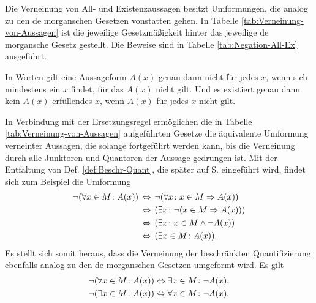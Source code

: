 Die Verneinung von All- und Existenzaussagen besitzt Umformungen, die
analog zu den de morganschen Gesetzen vonstatten gehen. In Tabelle
\ref{tab:Verneinung-von-Aussagen} ist die jeweilige Gesetzmäßigkeit
hinter das jeweilige de morgansche Gesetz gestellt. Die Beweise sind in
Tabelle \ref{tab:Negation-All-Ex} ausgeführt.

In Worten gilt eine Aussageform $A(x)$ genau dann nicht für jedes $x$,
wenn sich mindestens ein $x$ findet, für das $A(x)$ nicht gilt.
Und es existiert genau dann kein $A(x)$ erfüllendes $x$, wenn
$A(x)$ für jedes $x$ nicht gilt.

In Verbindung mit der Ersetzungsregel ermöglichen die in Tabelle
\ref{tab:Verneinung-von-Aussagen} aufgeführten Gesetze die
äquivalente Umformung verneinter Aussagen, die solange fortgeführt
werden kann, bis die Verneinung durch alle Junktoren und Quantoren
der Aussage gedrungen ist. Mit der Entfaltung von Def.
\ref{def:Beschr-Quant}, die später auf S. \pageref{def:Beschr-Quant}
eingeführt wird, findet sich zum Beispiel die Umformung
\begin{align*}
\lnot(\forall x\in M\colon A(x))
&\,\Leftrightarrow\, \lnot(\forall x\colon x\in M\Rightarrow A(x))\\
&\,\Leftrightarrow\, (\exists x\colon\lnot (x\in M\Rightarrow A(x)))\\
&\,\Leftrightarrow\, (\exists x\colon x\in M\land\lnot A(x))\\
&\,\Leftrightarrow\, (\exists x\in M\colon A(x)).
\end{align*}
Es stellt sich somit heraus, dass die Verneinung der beschränkten
Quantifizierung ebenfalls analog zu den de morganschen Gesetzen
umgeformt wird. Es gilt
\begin{align*}
\lnot(\forall x\in M\colon A(x)) &\Leftrightarrow \exists x\in M\colon \lnot A(x),\\
\lnot(\exists x\in M\colon A(x)) &\Leftrightarrow \forall x\in M\colon \lnot A(x).
\end{align*}

